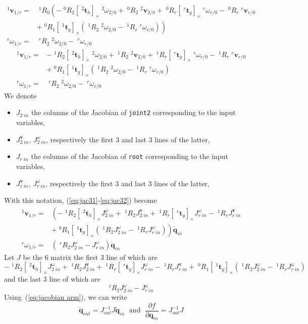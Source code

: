 \documentclass{article}
\newcommand\linvel{\mathbf{v}}
\newcommand\trans{\mathbf{t}}
\newcommand\conf{\mathbf{q}}
\begin{document}
\begin{align*}
  ^1\linvel_{1/r} =& \;^1R_0\left(
  -\;^0R_2[\;^2\trans_h]_{\times}\;^2\omega_{2/0} + \;^0R_2\;^2\linvel_{2/0}
  +\;^0R_r[\;^r\trans_g]_{\times}\;^r\omega_{r/0} - \;^0R_r\;^r\linvel_{r/0} \right.\\
  &\left.+\;^0R_1[\;^1\trans_g]_{\times} (\;^1R_2\;^2\omega_{2/0} - \;^1R_{r}\;^r\omega_{r/0})  \right)\\
  ^r\omega_{1/r} =& \;^rR_2\;^2\omega_{2/0} - \;^r\omega_{r/0}
\end{align*}
\begin{align}
  ^1\linvel_{1/r} =&
  -\;^1R_2[\;^2\trans_h]_{\times}\;^2\omega_{2/0} + \;^1R_2\;^2\linvel_{2/0}
  +\;^1R_r[\;^r\trans_g]_{\times}\;^r\omega_{r/0} - \;^1R_r\;^r\linvel_{r/0}\\
  \label{eq:jac31}
  &+\;^0R_1[\;^1\trans_g]_{\times} (\;^1R_2\;^2\omega_{2/0} - \;^1R_{r}\;^r\omega_{r/0})\\
  \label{eq:jac32}
  ^r\omega_{1/r} =& \;^rR_2\;^2\omega_{2/0} - \;^r\omega_{r/0}
\end{align}
We denote
\begin{itemize}
\item $J_{2\;in}$ the columns of the Jacobian of \texttt{joint2} corresponding to the input variables,
\item $J_{2\;in}^{\linvel}$, $J_{2\;in}^{\omega}$, respectively the first 3 and last 3 lines of the latter,
\item $J_{r\;in}$ the columns of the Jacobian of \texttt{root} corresponding to the input variables,
\item $J_{r\;in}^{\linvel}$, $J_{r\;in}^{\omega}$, respectively the first 3 and last 3 lines of the latter,
\end{itemize}
With this notation, (\ref{eq:jac31}-\ref{eq:jac32}) become
\begin{align*}
  ^1\linvel_{1/r} =&
  \left(-\;^1R_2[\;^2\trans_h]_{\times}J_{2\;in}^{\omega} + \;^1R_2J_{2\;in}^{\linvel}
  +\;^1R_r[\;^r\trans_g]_{\times}J_{r\;in}^{\omega} - \;^1R_rJ_{r\;in}^{\linvel}\right.\\
  &\left.+\;^0R_1[\;^1\trans_g]_{\times} (\;^1R_2J_{2\;in}^{\omega} - \;^1R_{r}J_{r\;in}^{\omega})\right)\dot{\conf}_{in}\\
  ^r\omega_{1/r} =& \left(\;^rR_2J_{2\;in}^{\omega} - J_{r\;in}^{\omega}\right)\dot{\conf}_{in}
\end{align*}
Let $J$ be the 6 matrix the first 3 line of which are
$$
-\;^1R_2[\;^2\trans_h]_{\times}J_{2\;in}^{\omega} + \;^1R_2J_{2\;in}^{\linvel}
+\;^1R_r[\;^r\trans_g]_{\times}J_{r\;in}^{\omega} - \;^1R_rJ_{r\;in}^{\linvel}+\;^0R_1[\;^1\trans_g]_{\times} (\;^1R_2J_{2\;in}^{\omega} - \;^1R_{r}J_{r\;in}^{\omega})
$$
and the last 3 line of which are
$$
^rR_2J_{2\;in}^{\omega} - J_{r\;in}^{\omega}
$$
Using~(\ref{eq:jacobian arm}), we can write
$$
\dot{\conf}_{out} = J_{out}^{-1}J \dot{\conf}_{in} \;\mbox{ and }\; \frac{\partial f}{\partial \conf_{in}} = J_{out}^{-1}J
$$


\end{document}
